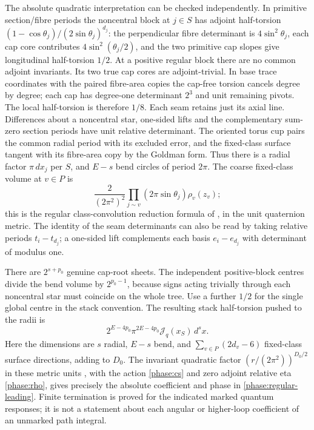 The absolute quadratic interpretation can be checked independently. In primitive section/fibre periods the noncentral block at \(j\in S\) has adjoint half-torsion
\((1-\cos\theta_j)/(2\sin\theta_j)^{d_j}\): the perpendicular fibre determinant is \(4\sin^2\theta_j\), each cap core contributes \(4\sin^2(\theta_j/2)\), and the two primitive cap slopes give longitudinal half-torsion \(1/2\). At a positive regular block there are no common adjoint invariants. Its two true cap cores are adjoint-trivial. In base trace coordinates with the paired fibre-area copies the cap-free torsion cancels degree by degree; each cap has degree-one determinant \(2^3\) and unit remaining pivots. The local half-torsion is therefore \(1/8\). Each seam retains just its axial line. Differences about a noncentral star, one-sided lifts and the complementary sum-zero section periods have unit relative determinant. The oriented torus cup pairs the common radial period with its excluded error, and the fixed-class surface tangent with its fibre-area copy by the Goldman form. Thus there is a radial factor \(\pi\,dx_j\) per \(S\), and \(E-s\) bend circles of period \(2\pi\). The coarse fixed-class volume at \(v\in P\) is
\[
 \frac{2}{(2\pi^2)^2}\prod_{j\sim v}(2\pi\sin\theta_j)\rho_v(z_v);
\]
this is the regular class-convolution reduction formula of \cite[Section 5.1]{AMW}, in the unit quaternion metric. The identity of the seam determinants can also be read by taking relative periods \(t_i-t_{d_j}\); a one-sided lift complements each basis \(e_i-e_{d_j}\) with determinant of modulus one.

There are \(2^{s+p_0}\) genuine cap-root sheets. The independent positive-block centres divide the bend volume by \(2^{p_0-1}\), because signs acting trivially through each noncentral star must coincide on the whole tree. Use a further \(1/2\) for the single global centre in the stack convention. The resulting stack half-torsion pushed to the radii is
\[
            2^{E-4p_0}\pi^{2E-4p_0}\mathcal J_q(x_S)\,d^s x.
\]
Here the dimensions are \(s\) radial, \(E-s\) bend, and \(\sum_{v\in P}(2d_v-6)\) fixed-class surface directions, adding to \(D_0\). The invariant quadratic factor \((r/(2\pi^2))^{D_0/2}\) in these metric units \cite{Adams}, with the action \eqref{phase:cs} and zero adjoint relative eta \eqref{phase:rho}, gives precisely the absolute coefficient and phase in \eqref{phase:regular-leading}. Finite termination is proved for the indicated marked quantum responses; it is not a statement about each angular or higher-loop coefficient of an unmarked path integral.
